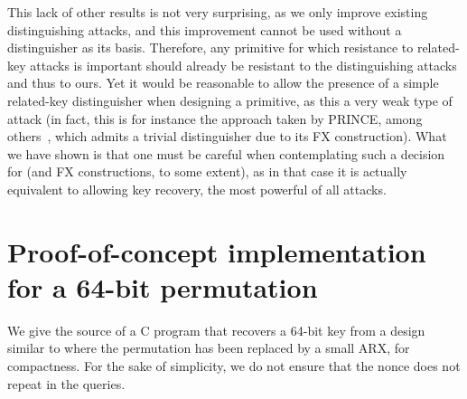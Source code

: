 This lack of other results is not very surprising, as we only improve existing distinguishing
attacks, and this improvement cannot be used without a distinguisher as its basis.
Therefore, any primitive for which resistance to related-key attacks is important should already be resistant
to the distinguishing attacks and thus to ours. Yet it would be reasonable to allow the presence
of a simple related-key distinguisher when designing a primitive, as this a very weak type of
attack (in fact, this is for instance the approach taken by PRINCE, among others~\cite{PRINCE}, which admits
a trivial distinguisher due to its \textsf{FX} construction).
What we have shown is that one must be
careful when contemplating such a decision for \EM (and \textsf{FX} constructions, to some extent), as in that case it is actually
equivalent to allowing key recovery, the most powerful of all attacks.

\setcounter{section}{0}
\renewcommand\thesection{\Alph{section}}

\section{Proof-of-concept implementation for a 64-bit permutation}
\label{sec:toy}

We give the source of a C program that recovers a 64-bit key from a design similar to \proestotr where
the permutation has been replaced by a small ARX, for compactness. For the sake of simplicity,
we do not ensure that the nonce does not repeat in the queries.

